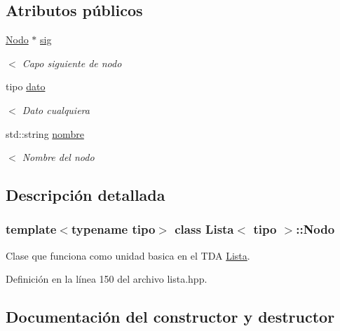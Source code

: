 \subsection*{Atributos públicos}
\begin{DoxyCompactItemize}
\item 
\mbox{\label{classLista_1_1Nodo_a8594ea833e1be652cb7a9b8be66bf97d}} 
\hyperlink{classLista_1_1Nodo}{Nodo} $\ast$ \hyperlink{classLista_1_1Nodo_a8594ea833e1be652cb7a9b8be66bf97d}{sig}
\begin{DoxyCompactList}\small\item\em $<$ Capo siguiente de nodo \end{DoxyCompactList}\item 
\mbox{\label{classLista_1_1Nodo_ae3e8f0073984b0791ba94590ea9e2c9f}} 
tipo \hyperlink{classLista_1_1Nodo_ae3e8f0073984b0791ba94590ea9e2c9f}{dato}
\begin{DoxyCompactList}\small\item\em $<$ Dato cualquiera \end{DoxyCompactList}\item 
\mbox{\label{classLista_1_1Nodo_ab6ad6f5015b5e8acd5f82ca3701eb804}} 
std\+::string \hyperlink{classLista_1_1Nodo_ab6ad6f5015b5e8acd5f82ca3701eb804}{nombre}
\begin{DoxyCompactList}\small\item\em $<$ Nombre del nodo \end{DoxyCompactList}\end{DoxyCompactItemize}


\subsection{Descripción detallada}
\subsubsection*{template$<$typename tipo$>$\newline
class Lista$<$ tipo $>$\+::\+Nodo}

Clase que funciona como unidad basica en el T\+DA \hyperlink{classLista}{Lista}. 

Definición en la línea 150 del archivo lista.\+hpp.



\subsection{Documentación del constructor y destructor}
\mbox{\label{classLista_1_1Nodo_a76d93da356c9904873c409f413737e58}} 
